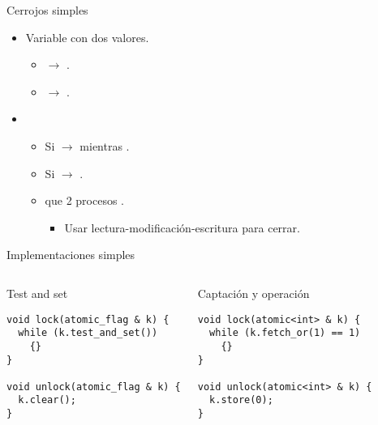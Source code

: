 \begin{frame}[t]{Cerrojos simples}
\begin{itemize}
  \item Variable   con dos valores.
    \begin{itemize}
      \item {} $\rightarrow$ .
      \item {} $\rightarrow$ .
    \end{itemize}

  \item {}
    \begin{itemize}
      \item Si  $\rightarrow$  mientras .
      \item Si  $\rightarrow$ .
      \item {} que 2 procesos .
        \begin{itemize}
          \item Usar lectura-modificación-escritura para cerrar.
        \end{itemize}
    \end{itemize}
\end{itemize}
\end{frame}

\begin{frame}[t,fragile]{Implementaciones simples}
\begin{columns}[T]

\begin{block}{Test and set}
\begin{lstlisting}
void lock(atomic_flag & k) {
  while (k.test_and_set())
    {}
}

void unlock(atomic_flag & k) {
  k.clear();
}
\end{lstlisting}
\end{block}

\pause
{}
\begin{block}{Captación y operación}
\begin{lstlisting}
void lock(atomic<int> & k) {
  while (k.fetch_or(1) == 1)
    {}
}

void unlock(atomic<int> & k) {
  k.store(0);
}
\end{lstlisting}
\end{block}

\end{columns}


\end{frame}


